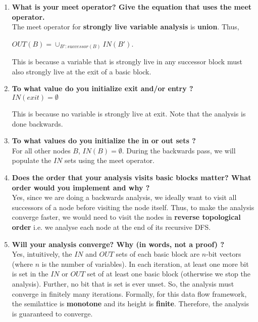 \begin{enumerate}
\item \textbf{What is your meet operator? Give the equation that uses the meet operator.} \\

  The meet operator for \textbf{strongly live variable analysis} is \textbf{union}. Thus,

  $OUT(B) = \cup_{B' : successor(B)} IN(B')$.

  This is because a variable that is strongly live in any successor block must also strongly live at the exit of a basic block. 

\item \textbf{To what value do you initialize exit and/or entry ?} \\

  $IN(exit) = \emptyset$

  This is because no variable is strongly live at exit. Note that the analysis is done backwards.

\item \textbf{To what values do you initialize the in or out sets ?} \\

  For all other nodes $B$, $IN(B) = \emptyset$. During the backwards pass, we will populate the $IN$ sets
  using the meet operator.

\item \textbf{Does the order that your analysis visits basic blocks matter? What order would you implement and why ?} \\

  Yes, since we are doing a backwards analysis, we ideally want to visit all successors of a node before visiting the node itself.
  Thus, to make the analysis converge faster, we would need to visit the nodes in \textbf{reverse topological order} i.e. we analyse each node
  at the end of its recursive DFS.

\item \textbf{Will your analysis converge? Why (in words, not a proof) ?} \\

  Yes, intuitively, the $IN$ and $OUT$ sets of each basic block are $n$-bit vectors (where $n$ is the number of variables).
  In each iteration, at least one more bit is set in the $IN$ or $OUT$ set of at least one basic block (otherwise we stop the analysis).
  Further, no bit that is set is ever unset.
  So, the analysis must converge in finitely many iterations.
  Formally, for this data flow framework, the semilattice is \textbf{monotone} and its height is \textbf{finite}.
  Therefore, the analysis is guaranteed to converge.


\end{enumerate}

